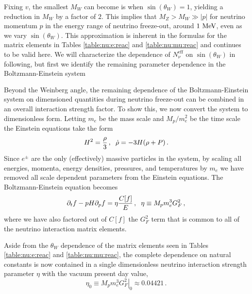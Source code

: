 Fixing $v$, the smallest $M_W$ can become is when $\sin(\theta_W)=1$, yielding a reduction in $M_W$ by a factor of $2$.  This implies that $M_Z>M_W\gg |p|$ for neutrino momentum $p$ in the energy range of neutrino freeze-out, around $1\text{ MeV}$, even as we vary $\sin(\theta_W)$.  This approximation is inherent in the formulas for the matrix elements  in Tables  \ref{table:nu:e:reac} and \ref{table:nu:mu:reac} and continues to be valid here. We will characterize the dependence of $N_\nu^{\mathrm{eff}}$ on $\sin(\theta_W)$ in following, but first we identify the remaining parameter dependence in the Boltzmann-Einstein system

Beyond the Weinberg angle, the remaining dependence of the Boltzmann-Einstein system on dimensioned quantities during  neutrino freeze-out  can be combined in an overall interaction strength factor.   To show this, we now convert the system  to dimensionless form. Letting $m_e$ be the mass scale and $M_p/m_e^2$ be the time scale the Einstein equations take the form
\begin{equation}
H^2=\frac{\rho}{3}\,,\hspace{2mm}\dot\rho=-3H(\rho+P)\,.
\end{equation}
 Since $e^\pm$ are the only (effectively) massive particles in the system, by scaling all energies, momenta, energy densities, pressures, and temperatures by $m_e$ we have removed all scale dependent parameters from the Einstein equations.  The Boltzmann-Einstein equation becomes
\begin{equation}\label{eta_def}
\partial_tf-pH\partial_pf=\eta\frac{C[f]}{E}\,,\hspace{2mm}\eta\equiv M_p m_e^3G_F^2\,,
\end{equation}
where we have also factored out of $C[f]$ the $G_F^2$ term that is common to all of the neutrino interaction matrix elements. 

Aside from the $\theta_W$ dependence of the matrix elements seen in Tables \ref{table:nu:e:reac} and \ref{table:nu:mu:reac}, the complete dependence on natural constants  is now contained in a single dimensionless neutrino interaction strength parameter $\eta$ with the vacuum present day value,
\begin{equation}\label{eta0_def}
\eta_0\equiv \left.M_p m_e^3 G_F^2\right|_0  \approx 0.04421\, .
\end{equation}

